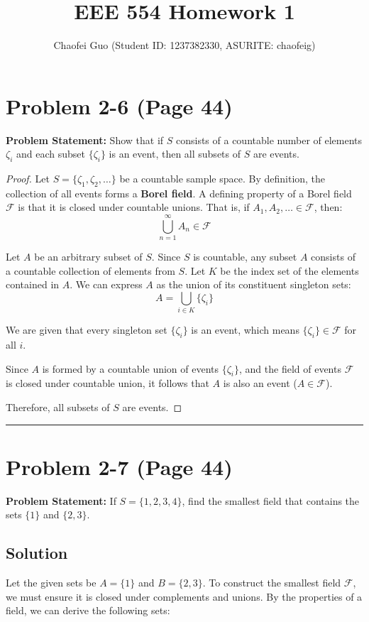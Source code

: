 \documentclass{article}
\title{EEE 554 Homework 1}
\author{Chaofei Guo (Student ID: 1237382330, ASURITE: chaofeig)}
\date{}
\begin{document}
\maketitle

\section*{Problem 2-6 (Page 44)}
\textbf{Problem Statement:} Show that if $S$ consists of a countable number of elements $\zeta_i$ and each subset $\{\zeta_i\}$ is an event, then all subsets of $S$ are events.

\begin{proof}
	Let $S = \{\zeta_1, \zeta_2, \dots\}$ be a countable sample space.
	By definition, the collection of all events forms a \textbf{Borel field}. A defining property of a Borel field $\mathcal{F}$ is that it is closed under countable unions. That is, if $A_1, A_2, \dots \in \mathcal{F}$, then:
	\[
		\bigcup_{n=1}^{\infty} A_n \in \mathcal{F}
	\]

	Let $A$ be an arbitrary subset of $S$. Since $S$ is countable, any subset $A$ consists of a countable collection of
	elements from $S$. Let $K$ be the index set of the elements contained in $A$. We can express $A$ as the union of its
	constituent singleton sets:
	\[
		A = \bigcup_{i \in K} \{\zeta_i\}
	\]

	We are given that every singleton set $\{\zeta_i\}$ is an event, which means $\{\zeta_i\} \in \mathcal{F}$ for all $i$.

	Since $A$ is formed by a countable union of events $\{\zeta_i\}$, and the field of events $\mathcal{F}$ is closed under
	countable union, it follows that $A$ is also an event ($A \in \mathcal{F}$).

	Therefore, all subsets of $S$ are events.
\end{proof}

\vspace{1cm}
\hrule
\vspace{1cm}

\section*{Problem 2-7 (Page 44)}
\textbf{Problem Statement:} If $S = \{1, 2, 3, 4\}$, find the smallest field that contains the sets $\{1\}$ and $\{2, 3\}$.

\subsection*{Solution}
Let the given sets be $A = \{1\}$ and $B = \{2, 3\}$. To construct the smallest field $\mathcal{F}$, we must ensure it
is closed under complements and unions. By the properties of a field, we can derive the following sets:
\end{document}
